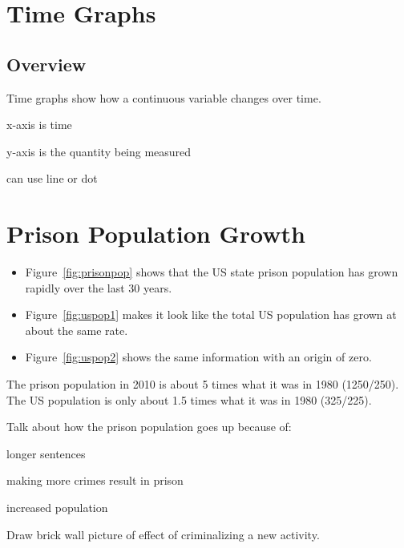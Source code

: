 \documentclass[letterpaper, landscape]{article}
\begin{document}
  \section{Time Graphs}

  \subsection{Overview}

  Time graphs show how a continuous variable changes over time.  

  \begin{itemize*}
    \item x-axis is time
    \item y-axis is the quantity being measured
    \item can use line or dot
  \end{itemize*}

  \section{Prison Population Growth} %
  
  \begin{itemize} 
    
    \item Figure~\ref{fig:prisonpop} shows that the US state prison population has grown
      rapidly over the last 30 years.

    \item Figure~\ref{fig:uspop1} makes it look like the total US population has grown at
      about the same rate.

    \item Figure~\ref{fig:uspop2} shows the same information with an origin of zero.
  \end{itemize}

  The prison population in 2010 is about 5 times what it was in 1980 (1250/250). The US
  population is only about 1.5 times what it was in 1980 (325/225).

  Talk about how the prison population goes up because of:
  \begin{itemize*}
    \item longer sentences
    \item making more crimes result in prison
    \item increased population
  \end{itemize*}

  Draw brick wall picture of effect of criminalizing a new activity.
\end{document}
